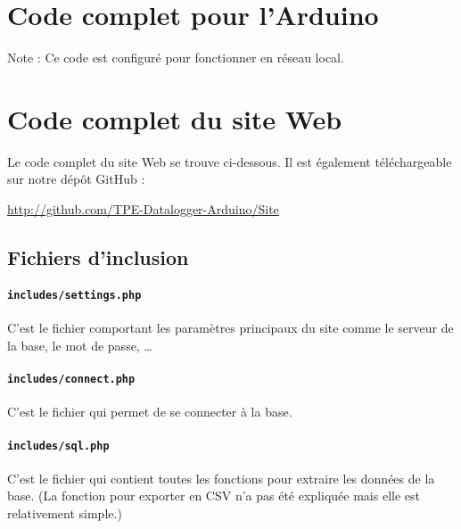 \chapter{Code complet pour l'Arduino}
\label{code:arduino}

Note : Ce code est configuré pour fonctionner en réseau local.


\chapter{Code complet du site Web}
\label{code:site}

Le code complet du site Web se trouve ci-dessous. Il est également téléchargeable sur notre dépôt GitHub :
\begin{center}
	\url{http://github.com/TPE-Datalogger-Arduino/Site}
\end{center}

\section{Fichiers d'inclusion}

\cprotect\subsubsection{\verb-includes/settings.php-}

C'est le fichier comportant les paramètres principaux du site comme le serveur de la base, le mot de passe, \dots
{}

\cprotect\subsubsection{\verb-includes/connect.php-}

C'est le fichier qui permet de se connecter à la base.

\cprotect\subsubsection{\verb-includes/sql.php-}

C'est le fichier qui contient toutes les fonctions pour extraire les données de la base. (La fonction pour exporter en CSV n'a pas été expliquée mais elle est relativement simple.)

